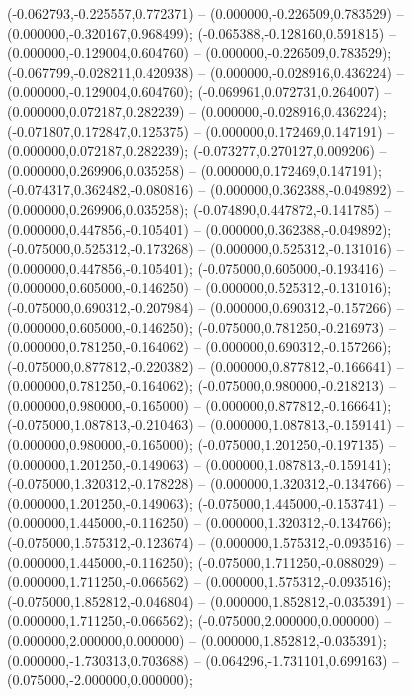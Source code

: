  (-0.062793,-0.225557,0.772371) -- (0.000000,-0.226509,0.783529) -- (0.000000,-0.320167,0.968499);
 (-0.065388,-0.128160,0.591815) -- (0.000000,-0.129004,0.604760) -- (0.000000,-0.226509,0.783529);
 (-0.067799,-0.028211,0.420938) -- (0.000000,-0.028916,0.436224) -- (0.000000,-0.129004,0.604760);
 (-0.069961,0.072731,0.264007) -- (0.000000,0.072187,0.282239) -- (0.000000,-0.028916,0.436224);
 (-0.071807,0.172847,0.125375) -- (0.000000,0.172469,0.147191) -- (0.000000,0.072187,0.282239);
 (-0.073277,0.270127,0.009206) -- (0.000000,0.269906,0.035258) -- (0.000000,0.172469,0.147191);
 (-0.074317,0.362482,-0.080816) -- (0.000000,0.362388,-0.049892) -- (0.000000,0.269906,0.035258);
 (-0.074890,0.447872,-0.141785) -- (0.000000,0.447856,-0.105401) -- (0.000000,0.362388,-0.049892);
 (-0.075000,0.525312,-0.173268) -- (0.000000,0.525312,-0.131016) -- (0.000000,0.447856,-0.105401);
 (-0.075000,0.605000,-0.193416) -- (0.000000,0.605000,-0.146250) -- (0.000000,0.525312,-0.131016);
 (-0.075000,0.690312,-0.207984) -- (0.000000,0.690312,-0.157266) -- (0.000000,0.605000,-0.146250);
 (-0.075000,0.781250,-0.216973) -- (0.000000,0.781250,-0.164062) -- (0.000000,0.690312,-0.157266);
 (-0.075000,0.877812,-0.220382) -- (0.000000,0.877812,-0.166641) -- (0.000000,0.781250,-0.164062);
 (-0.075000,0.980000,-0.218213) -- (0.000000,0.980000,-0.165000) -- (0.000000,0.877812,-0.166641);
 (-0.075000,1.087813,-0.210463) -- (0.000000,1.087813,-0.159141) -- (0.000000,0.980000,-0.165000);
 (-0.075000,1.201250,-0.197135) -- (0.000000,1.201250,-0.149063) -- (0.000000,1.087813,-0.159141);
 (-0.075000,1.320312,-0.178228) -- (0.000000,1.320312,-0.134766) -- (0.000000,1.201250,-0.149063);
 (-0.075000,1.445000,-0.153741) -- (0.000000,1.445000,-0.116250) -- (0.000000,1.320312,-0.134766);
 (-0.075000,1.575312,-0.123674) -- (0.000000,1.575312,-0.093516) -- (0.000000,1.445000,-0.116250);
 (-0.075000,1.711250,-0.088029) -- (0.000000,1.711250,-0.066562) -- (0.000000,1.575312,-0.093516);
 (-0.075000,1.852812,-0.046804) -- (0.000000,1.852812,-0.035391) -- (0.000000,1.711250,-0.066562);
 (-0.075000,2.000000,0.000000) -- (0.000000,2.000000,0.000000) -- (0.000000,1.852812,-0.035391);
 (0.000000,-1.730313,0.703688) -- (0.064296,-1.731101,0.699163) -- (0.075000,-2.000000,0.000000);
